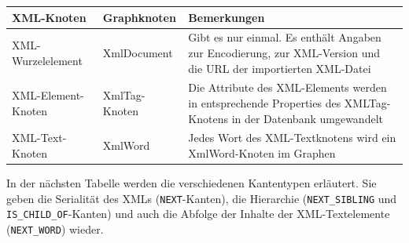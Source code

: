 \documentclass[12pt,ngerman,]{article}
\begin{document}
\begin{longtable}[]{@{}lll@{}}
\toprule
\begin{minipage}[b]{0.24\columnwidth}\raggedright\strut
XML-Knoten\strut
\end{minipage} & \begin{minipage}[b]{0.23\columnwidth}\raggedright\strut
Graphknoten\strut
\end{minipage} & \begin{minipage}[b]{0.44\columnwidth}\raggedright\strut
Bemerkungen\strut
\end{minipage}\tabularnewline
\midrule
\endhead
\begin{minipage}[t]{0.24\columnwidth}\raggedright\strut
XML-Wurzelelement\strut
\end{minipage} & \begin{minipage}[t]{0.23\columnwidth}\raggedright\strut
XmlDocument\strut
\end{minipage} & \begin{minipage}[t]{0.44\columnwidth}\raggedright\strut
Gibt es nur einmal. Es enthält Angaben zur Encodierung, zur XML-Version
und die URL der importierten XML-Datei\strut
\end{minipage}\tabularnewline
\begin{minipage}[t]{0.24\columnwidth}\raggedright\strut
XML-Element-Knoten\strut
\end{minipage} & \begin{minipage}[t]{0.23\columnwidth}\raggedright\strut
XmlTag-Knoten\strut
\end{minipage} & \begin{minipage}[t]{0.44\columnwidth}\raggedright\strut
Die Attribute des XML-Elements werden in entsprechende Properties des
XMLTag-Knotens in der Datenbank umgewandelt\strut
\end{minipage}\tabularnewline
\begin{minipage}[t]{0.24\columnwidth}\raggedright\strut
XML-Text-Knoten\strut
\end{minipage} & \begin{minipage}[t]{0.23\columnwidth}\raggedright\strut
XmlWord\strut
\end{minipage} & \begin{minipage}[t]{0.44\columnwidth}\raggedright\strut
Jedes Wort des XML-Textknotens wird ein XmlWord-Knoten im Graphen\strut
\end{minipage}\tabularnewline
\bottomrule
\end{longtable}

In der nächsten Tabelle werden die verschiedenen Kantentypen erläutert.
Sie geben die Serialität des XMLs (\texttt{NEXT}-Kanten), die Hierarchie
(\texttt{NEXT\_SIBLING} und \texttt{IS\_CHILD\_OF}-Kanten) und auch die
Abfolge der Inhalte der XML-Textelemente (\texttt{NEXT\_WORD}) wieder.
\end{document}
